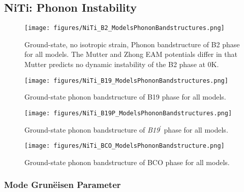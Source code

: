 \documentclass[preprint,colorlinks=true,linkcolor=black,citecolor=black]{elsarticle}
\begin{document}
\subsection{NiTi: Phonon Instability}
\label{subsec:nitiphonons}

\begin{figure}[!htp]
	\begin{centering}
		\texttt{[image: figures/NiTi\_B2\_ModelsPhononBandstructures.png]}
		\caption{ Ground-state, no isotropic strain, Phonon bandstructure
			of B2 phase for all models. The Mutter and Zhong EAM potentials
			differ in that Mutter predicts no dynamic instability of the B2
			phase at 0K.  }
		\label{fig:allmodels_b2}
	\end{centering}
\end{figure}

\begin{figure}[!htp]
	\begin{centering}
		\texttt{[image: figures/NiTi\_B19\_ModelsPhononBandstructures.png]}
		\caption{ Ground-state phonon bandstructure of B19 phase for all
			models.  }
		\label{fig:allmodels_B19P}
	\end{centering}
\end{figure}

\begin{figure}[!htp]
	\begin{centering}
		\texttt{[image: figures/NiTi\_B19P\_ModelsPhononBandstructures.png]}
		\caption{ Ground-state phonon bandstructure of
			\textit{B19}$^\prime$ phase for all models.  }
		\label{fig:allmodels_B19P}
	\end{centering}
\end{figure}

\begin{figure}[!htp]
	\begin{centering}
		\texttt{[image: figures/NiTi\_BCO\_ModelsPhononBandstructure.png]}
		\caption{ Ground-state phonon bandstructure of BCO phase for all
			models.  }
		\label{fig:allmodels_B19P}
	\end{centering}
\end{figure}

\subsubsection{Mode Grun\"{e}isen Parameter}
\end{document}

